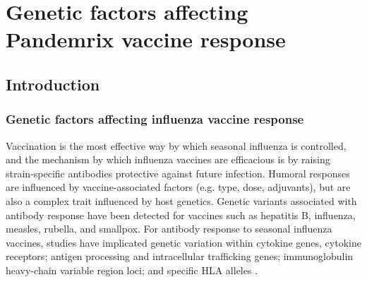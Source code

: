 %
%

\chapter{Genetic factors affecting Pandemrix vaccine response}
\label{chap:hird_reQTL}


\section{Introduction}

\subsection{Genetic factors affecting influenza vaccine response}

Vaccination is the most effective way by which seasonal influenza is controlled\autocite{houser2015InfluenzaVaccinesChallenges},
and the mechanism by which influenza vaccines are efficacious is by raising strain-specific antibodies protective against future infection\autocite{nauta2009RelationshipMeanAntibody}.
Humoral responses are influenced by vaccine-associated factors (e.g. type, dose, adjuvants), 
but are also a complex trait influenced by host genetics\autocite{mentzer2015SearchingHumanGenetic,linnik2016ImpactHostGenetic}.
Genetic variants associated with antibody response have been detected for vaccines such as hepatitis B, influenza, measles, rubella, and smallpox\autocite{linnik2016ImpactHostGenetic,dhakal2019HostFactorsImpact}.
For antibody response to seasonal influenza vaccines, studies have implicated 
genetic variation within cytokine genes, cytokine receptors\autocite{poland2008ImmunogeneticsSeasonalInfluenza};
antigen processing and intracellular trafficking genes\autocite{franco2013IntegrativeGenomicAnalysis}; 
immunoglobulin heavy-chain variable region loci\autocite{avnir2016IGHV169PolymorphismModulates};
and specific \gls{HLA} alleles \autocite{poland2008ImmunogeneticsSeasonalInfluenza,moss2013CorrelationHumanLeukocyte}.

